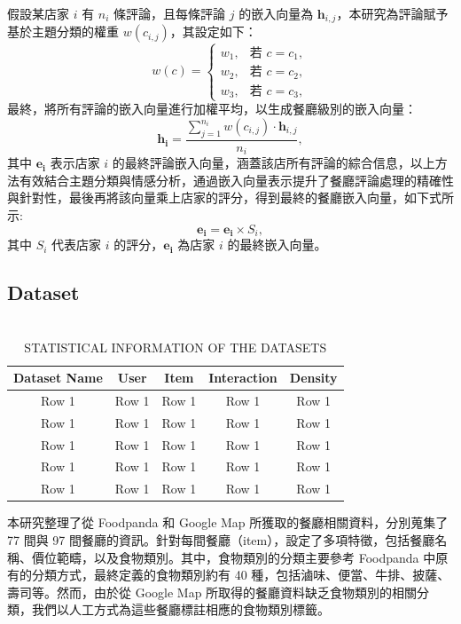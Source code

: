         假設某店家 \(i\) 有 \(n_i\) 條評論，且每條評論 \(j\) 的嵌入向量為 \(\mathbf{h}_{i,j}\)，本研究為評論賦予基於主題分類的權重 \(w(c_{i,j})\)，其設定如下：
        \begin{equation}
            w(c) =
            \begin{cases}
            w_{1}, & \text{若 } c = c_1, \\
            w_{2}, & \text{若 } c = c_2, \\
            w_{3}, & \text{若 } c = c_3,
            \end{cases}
        \end{equation}
        最終，將所有評論的嵌入向量進行加權平均，以生成餐廳級別的嵌入向量：
        \begin{equation}
            \mathbf{h_i} = \frac{\sum_{j=1}^{n_i} w(c_{i,j}) \cdot \mathbf{h}_{i,j}}{n_i},
        \end{equation}
        其中 \(\mathbf{e_i}\) 表示店家 \(i\) 的最終評論嵌入向量，涵蓋該店所有評論的綜合信息，以上方法有效結合主題分類與情感分析，通過嵌入向量表示提升了餐廳評論處理的精確性與針對性，最後再將該向量乘上店家的評分，得到最終的餐廳嵌入向量，如下式所示:
        \begin{equation}
            \mathbf{e_i} = \mathbf{e_i} \times S_i,
        \end{equation}
        其中 \(S_i\) 代表店家 \(i\) 的評分，\(\mathbf{e_i}\) 為店家 \(i\) 的最終嵌入向量。
        


    \subsection{Dataset}
        \begin{table}[h]
            \centering
            \caption{\\ STATISTICAL INFORMATION OF THE DATASETS}
            \begin{tabular}{|c|c|c|c|c|}
            \hline
            \textbf{Dataset Name} & \textbf{User} & \textbf{Item} & \textbf{Interaction} & \textbf{Density} \\
            \hline
            Row 1 & Row 1 & Row 1 & Row 1 & Row 1 \\
            \hline
            Row 1 & Row 1 & Row 1 & Row 1 & Row 1 \\
            \hline
            Row 1 & Row 1 & Row 1 & Row 1 & Row 1 \\
            \hline
            Row 1 & Row 1 & Row 1 & Row 1 & Row 1 \\
            \hline
            Row 1 & Row 1 & Row 1 & Row 1 & Row 1 \\
            \hline
            \end{tabular}
            \label{table2}
        \end{table}
        本研究整理了從 Foodpanda 和 Google Map 所獲取的餐廳相關資料，分別蒐集了 77 間與 97 間餐廳的資訊。針對每間餐廳（item），設定了多項特徵，包括餐廳名稱、價位範疇，以及食物類別。其中，食物類別的分類主要參考 Foodpanda 中原有的分類方式，最終定義的食物類別約有 40 種，包括滷味、便當、牛排、披薩、壽司等。然而，由於從 Google Map 所取得的餐廳資料缺乏食物類別的相關分類，我們以人工方式為這些餐廳標註相應的食物類別標籤。
        
\color{black}
